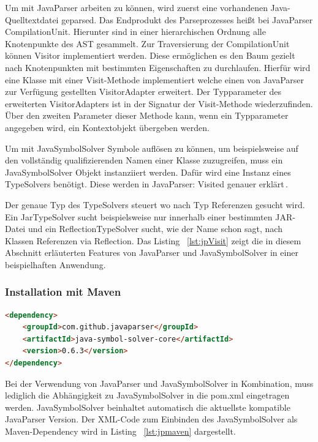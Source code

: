 \documentclass[12pt,oneside,a4paper,parskip]{scrbook}
\begin{document}
Um mit JavaParser arbeiten zu können, wird zuerst eine vorhandenen Java-Quelltextdatei geparsed. Das Endprodukt des Parseprozesses heißt bei JavaParser CompilationUnit. Hierunter sind in einer hierarchischen Ordnung alle Knotenpunkte des AST gesammelt. Zur Traversierung der CompilationUnit können Visitor implementiert werden. Diese ermöglichen es den Baum gezielt nach Knotenpunkten mit bestimmten Eigenschaften zu durchlaufen. Hierfür wird eine Klasse mit einer Visit-Methode implementiert welche einen von JavaParser zur Verfügung gestellten VisitorAdapter erweitert. Der Typparameter des erweiterten VisitorAdapters ist in der Signatur der Visit-Methode wiederzufinden. Über den zweiten Parameter dieser Methode kann, wenn ein Typparameter angegeben wird, ein Kontextobjekt übergeben werden.

Um mit JavaSymbolSolver Symbole auflösen zu können, um beispielsweise auf den vollständig qualifizierenden Namen einer Klasse zuzugreifen, muss ein JavaSymbolSolver Objekt instanziiert werden. Dafür wird eine Instanz eines TypeSolvers benötigt. Diese werden in JavaParser: Visited genauer erklärt\,\cite[S. 39ff.]{javaparser2017}. 

Der genaue Typ des TypeSolvers steuert wo nach Typ Referenzen gesucht wird. Ein JarTypeSolver sucht beispielsweise nur innerhalb einer bestimmten JAR-Datei und ein ReflectionTypeSolver sucht, wie der Name schon sagt, nach Klassen Referenzen via Reflection. Das Listing ~\ref{lst:jpVisit} zeigt die in diesem Abschnitt erläuterten Features von JavaParser und JavaSymbolSolver in einer beispielhaften Anwendung.

\subsubsection{Installation mit Maven}

\begin{lstlisting}[label=lst:jpmaven,
language=HTML,
firstnumber=1,
caption=XML-Code zum Einbinden von JavaParser und JavaSymbolSolver als Maven-Dependency.]
<dependency>
	<groupId>com.github.javaparser</groupId>
	<artifactId>java-symbol-solver-core</artifactId>
	<version>0.6.3</version>
</dependency>
\end{lstlisting}

Bei der Verwendung von JavaParser und JavaSymbolSolver in Kombination, muss lediglich die Abhängigkeit zu JavaSymbolSolver in die pom.xml eingetragen werden. JavaSymbolSolver beinhaltet automatisch die aktuellste kompatible JavaParser Version. Der XML-Code zum Einbinden des JavaSymbolSolver als Maven-Dependency wird in Listing ~\ref{lst:jpmaven} dargestellt.
\end{document}
